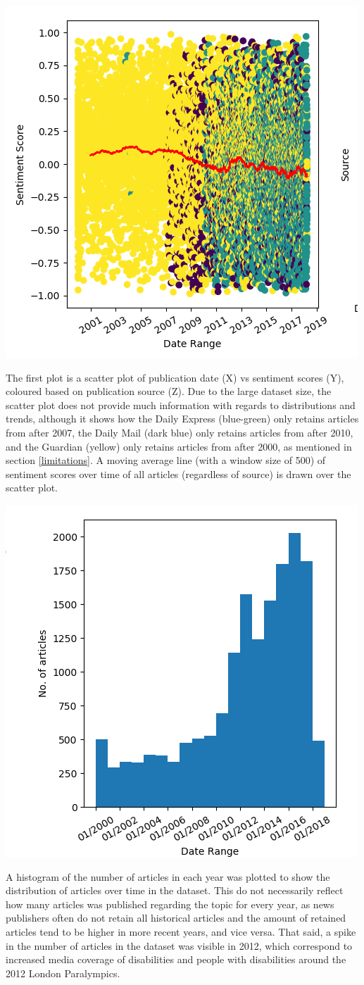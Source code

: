 \documentclass{report}
\newcommand{\textapprox}{\raisebox{0.5ex}{\texttildelow}}  %
\begin{document}
\begin{center}
	\includegraphics[height=0.5\linewidth]{row-1-col-1.png}
\end{center}

The first plot is a scatter plot of publication date (X) vs sentiment scores (Y), coloured based on publication source (Z). 
Due to the large dataset size, the scatter plot does not provide much information with regards to distributions and trends, although it shows how the Daily Express (blue-green) only retains articles from after \textapprox2007, the Daily Mail (dark blue) only retains articles from after \textapprox2010, and the Guardian (yellow) only retains articles from after \textapprox2000, as mentioned in section \ref{limitations}.
A moving average line (with a window size of 500) of sentiment scores over time of all articles (regardless of source) is drawn over the scatter plot.

\begin{center}
	\includegraphics[width=0.5\linewidth]{row-1-col-3.png}
\end{center}

A histogram of the number of articles in each year was plotted to show the distribution of articles over time in the dataset. 
This do not necessarily reflect how many articles was published regarding the topic for every year, as news publishers often do not retain all historical articles and the amount of retained articles tend to be higher in more recent years, and vice versa.
That said, a spike in the number of articles in the dataset was visible in 2012, which correspond to increased media coverage of disabilities and people with disabilities around the 2012 London Paralympics.
\end{document}
